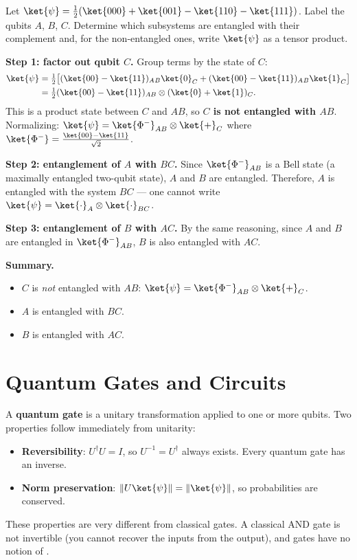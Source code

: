 \documentclass[oneside]{academica}
\begin{document}
\begin{exercise*}
  Let $\ket{\psi}=\tfrac{1}{2}(\ket{000}+\ket{001}-\ket{110}-\ket{111})$.
  Label the qubits $A$, $B$, $C$.
  Determine which subsystems are entangled with their complement and, for the non-entangled ones, write $\ket{\psi}$ as a tensor product.

  \textbf{Step 1: factor out qubit $C$.}
  Group terms by the state of $C$:
  \begin{align*}
    \ket{\psi} &= \tfrac{1}{2}\bigl[(\ket{00}-\ket{11})_A{}_B\ket{0}_C
                              +(\ket{00}-\ket{11})_A{}_B\ket{1}_C\bigr] \\
              &= \tfrac{1}{2}(\ket{00}-\ket{11})_{AB}\otimes(\ket{0}+\ket{1})_C.
  \end{align*}
  This is a product state between $C$ and $AB$, so \textbf{$C$ is not entangled with $AB$}.
  Normalizing: $\ket{\psi}=\ket{\Phi^-}_{AB}\otimes\ket{+}_C$ where $\ket{\Phi^-}=\tfrac{\ket{00}-\ket{11}}{\sqrt{2}}$.

  \textbf{Step 2: entanglement of $A$ with $BC$.}
  Since $\ket{\Phi^-}_{AB}$ is a Bell state (a maximally entangled two-qubit state), $A$ and $B$ are entangled.
  Therefore, $A$ is entangled with the system $BC$ --- one cannot write $\ket{\psi}=\ket{\cdot}_A\otimes\ket{\cdot}_{BC}$.

  \textbf{Step 3: entanglement of $B$ with $AC$.}
  By the same reasoning, since $A$ and $B$ are entangled in $\ket{\Phi^-}_{AB}$, $B$ is also entangled with $AC$.

  \textbf{Summary.}
  \begin{itemize}
    \item $C$ is \emph{not} entangled with $AB$: $\ket{\psi}=\ket{\Phi^-}_{AB}\otimes\ket{+}_C$.
    \item $A$ is entangled with $BC$.
    \item $B$ is entangled with $AC$.
  \end{itemize}
\end{exercise*}

\chapter{Quantum Gates and Circuits}\label{chap:gates}

A \textbf{quantum gate} is a unitary transformation applied to one or more qubits.
Two properties follow immediately from unitarity:
\begin{itemize}
  \item \textbf{Reversibility}: $U^\dagger U=I$, so $U^{-1}=U^\dagger$ always exists.
    Every quantum gate has an inverse.
  \item \textbf{Norm preservation}: $\|U\ket{\psi}\|=\|\ket{\psi}\|$, so probabilities are conserved.
\end{itemize}
These properties are very different from classical gates.
A classical AND gate is not invertible (you cannot recover the inputs from the output), and gates have no notion of .
\end{document}
